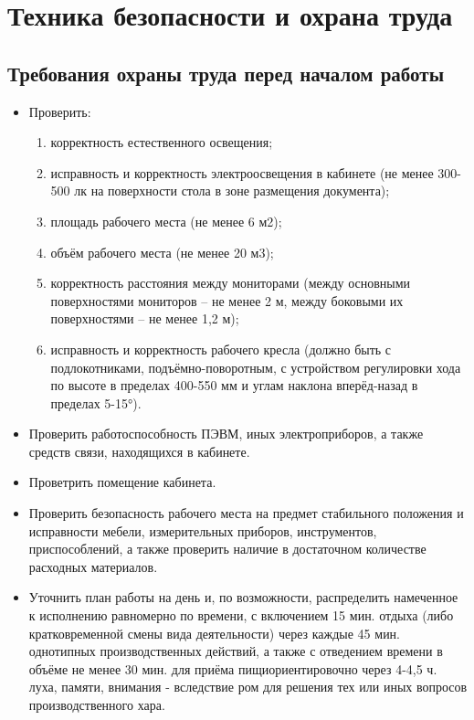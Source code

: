 \section{Техника безопасности и охрана труда}

\tocless\subsection{Требования охраны труда перед началом работы}

\begin{itemize}
    \item Проверить:
    \begin{enumerate}
        \item корректность естественного освещения;
        \item исправность и корректность электроосвещения в кабинете (не менее 300-500 лк на поверхности стола в зоне размещения документа);
        \item площадь рабочего места (не менее 6 м2);
        \item объём рабочего места (не менее 20 м3);
        \item корректность расстояния между мониторами (между основными поверхностями мониторов – не менее 2 м, между боковыми их поверхностями – не менее 1,2 м);
        \item исправность и корректность рабочего кресла (должно быть с подлокотниками, подъёмно-поворотным, с устройством регулировки хода по высоте в пределах 400-550 мм и углам наклона вперёд-назад в пределах 5-15°).
    \end{enumerate}
    \item Проверить работоспособность ПЭВМ, иных электроприборов, а также средств связи, находящихся в кабинете.
    \item Проветрить помещение кабинета.
    \item Проверить безопасность рабочего места на предмет стабильного положения и исправности мебели, измерительных приборов, инструментов, приспособлений, а также проверить наличие в достаточном количестве расходных материалов.
    \item Уточнить план работы на день и, по возможности, распределить намеченное к исполнению равномерно по времени, с включением 15 мин. отдыха (либо кратковременной смены вида деятельности) через каждые 45 мин. однотипных производственных действий, а также с отведением времени в объёме не менее 30 мин. для приёма пищиориентировочно через 4-4,5 ч. луха, памяти, внимания - вследствие ром для решения тех или иных вопросов производственного хара.
\end{itemize}

